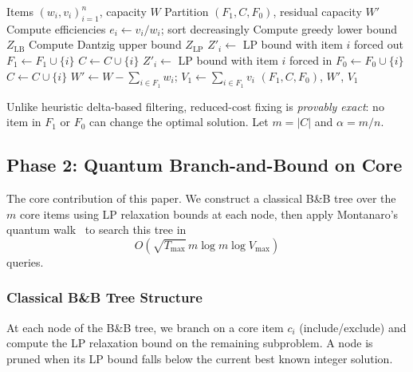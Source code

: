 \documentclass[conference]{IEEEtran}
\begin{document}
\begin{algorithm}[h]
\caption{Reduced-Cost Variable Fixing}
\label{alg:filter}
\begin{algorithmic}[1]
\REQUIRE Items $(w_i, v_i)_{i=1}^n$, capacity $W$
\ENSURE Partition $(F_1, C, F_0)$, residual capacity $W'$
\STATE Compute efficiencies $e_i \leftarrow v_i / w_i$; sort decreasingly
\STATE Compute greedy lower bound $Z_{\text{LB}}$
\STATE Compute Dantzig upper bound $Z_{\text{LP}}$
        \STATE $Z'_i \leftarrow$ LP bound with item $i$ forced out
            \STATE $F_1 \leftarrow F_1 \cup \{i\}$ 
        \ELSE
            \STATE $C \leftarrow C \cup \{i\}$
        \ENDIF
    \ELSE
        \STATE $Z'_i \leftarrow$ LP bound with item $i$ forced in
            \STATE $F_0 \leftarrow F_0 \cup \{i\}$ 
        \ELSE
            \STATE $C \leftarrow C \cup \{i\}$
        \ENDIF
    \ENDIF
\ENDFOR
\STATE $W' \leftarrow W - \sum_{i \in F_1} w_i$; $V_1 \leftarrow \sum_{i \in F_1} v_i$
\RETURN $(F_1, C, F_0)$, $W'$, $V_1$
\end{algorithmic}
\end{algorithm}

Unlike heuristic delta-based filtering, reduced-cost fixing is \textit{provably exact}: no item in $F_1$ or $F_0$ can change the optimal solution. Let $m = |C|$ and $\alpha = m/n$.

\subsection{Phase 2: Quantum Branch-and-Bound on Core}

The core contribution of this paper. We construct a classical B\&B tree over the $m$ core items using LP relaxation bounds at each node, then apply Montanaro's quantum walk~\cite{ref24} to search this tree in $$O\!\left(\sqrt{T_{\max}}\,m\log m\log V_{\max}\right)$$ queries.

\subsubsection{Classical B\&B Tree Structure}

At each node of the B\&B tree, we branch on a core item $c_i$ (include/exclude) and compute the LP relaxation bound on the remaining subproblem. A node is pruned when its LP bound falls below the current best known integer solution.
\end{document}
